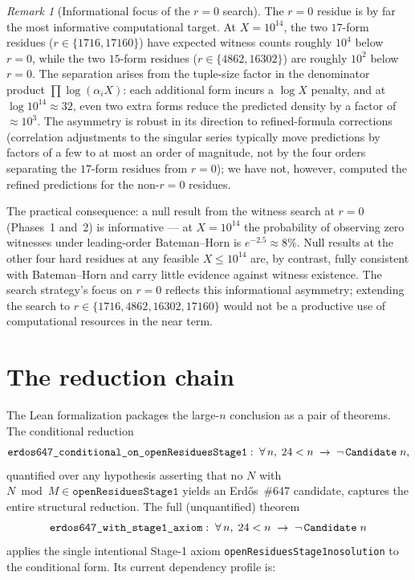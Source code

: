 \documentclass[11pt]{article}
\renewcommand{\_}{\origunderscore\allowbreak}
\theoremstyle{definition}
\theoremstyle{remark}
\newtheorem{remark}[theorem]{Remark}
\begin{document}
\begin{remark}[Informational focus of the $r=0$ search]
The $r=0$ residue is by far the most informative computational
target. At $X=10^{14}$, the two $17$-form residues ($r\in\{1716,
17160\}$) have expected witness counts roughly $10^{4}$ below
$r=0$, while the two $15$-form residues ($r\in\{4862,16302\}$) are
roughly $10^{2}$ below $r=0$. The separation arises from the
tuple-size factor in the denominator product
$\prod\log(\alpha_i X)$: each additional form incurs a $\log X$
penalty, and at $\log 10^{14}\approx 32$, even two extra forms
reduce the predicted density by a factor of $\approx 10^{3}$. The
asymmetry is robust in its direction to refined-formula corrections
(correlation adjustments to the singular series typically move
predictions by factors of a few to at most an order of magnitude,
not by the four orders separating the $17$-form residues from
$r=0$); we have not, however, computed the refined predictions for
the non-$r=0$ residues.

The practical consequence: a null result from the witness search at
$r=0$ (Phases~1 and~2) is informative — at $X=10^{14}$ the
probability of observing zero witnesses under leading-order
Bateman--Horn is $e^{-2.5}\approx 8\%$. Null results at the other
four hard residues at any feasible $X\le 10^{14}$ are, by contrast,
fully consistent with Bateman--Horn and carry little evidence
against witness existence. The search strategy's focus on $r=0$
reflects this informational asymmetry; extending the search to
$r\in\{1716,4862,16302,17160\}$ would not be a productive use of
computational resources in the near term.
\end{remark}

\section{The reduction chain}\label{sec:chain}

The Lean formalization packages the large-$n$ conclusion as a pair of
theorems. The conditional reduction
\[
\texttt{erdos647\_conditional\_on\_openResiduesStage1}:\;
\forall\, n,\; 24<n \;\to\; \lnot\,\texttt{Candidate}\;n,
\]
quantified over any hypothesis asserting that no $N$ with
$N\bmod M\in\texttt{openResiduesStage1}$ yields an Erd\H{o}s~\#647
candidate, captures the entire structural reduction.
The full (unquantified) theorem
\[
\texttt{erdos647\_with\_stage1\_axiom}:\;
\forall\, n,\; 24<n \;\to\; \lnot\,\texttt{Candidate}\;n
\]
applies the single intentional Stage-1 axiom
\texttt{openResiduesStage1\_no\_solution} to the conditional form.
Its current dependency profile is:
\end{document}

